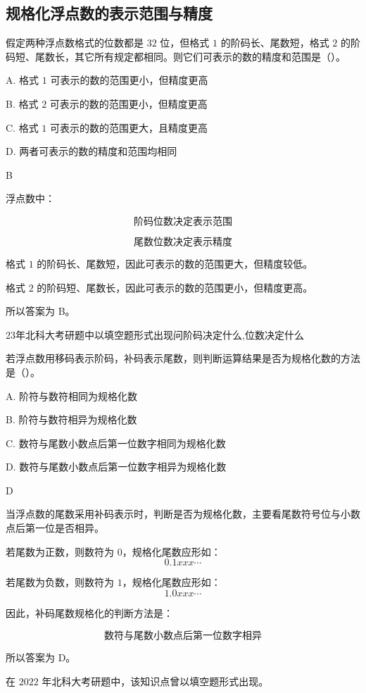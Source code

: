 \subsection{规格化浮点数的表示范围与精度}

\begin{question}
假定两种浮点数格式的位数都是 $32$ 位，但格式 $1$ 的阶码长、尾数短，格式 $2$ 的阶码短、尾数长，其它所有规定都相同。则它们可表示的数的精度和范围是（）。

A. 格式 $1$ 可表示的数的范围更小，但精度更高

B. 格式 $2$ 可表示的数的范围更小，但精度更高

C. 格式 $1$ 可表示的数的范围更大，且精度更高

D. 两者可表示的数的精度和范围均相同
\end{question}

\begin{answer}
B
\end{answer}

\begin{analysisenv}
浮点数中：

\[
\text{阶码位数决定表示范围}
\]

\[
\text{尾数位数决定表示精度}
\]

格式 $1$ 的阶码长、尾数短，因此可表示的数的范围更大，但精度较低。

格式 $2$ 的阶码短、尾数长，因此可表示的数的范围更小，但精度更高。

所以答案为 B。

23年北科大考研题中以填空题形式出现问阶码决定什么,位数决定什么
\end{analysisenv}




\begin{question}
若浮点数用移码表示阶码，补码表示尾数，则判断运算结果是否为规格化数的方法是（）。

A. 阶符与数符相同为规格化数

B. 阶符与数符相异为规格化数

C. 数符与尾数小数点后第一位数字相同为规格化数

D. 数符与尾数小数点后第一位数字相异为规格化数
\end{question}

\begin{answer}
D
\end{answer}

\begin{analysisenv}
当浮点数的尾数采用补码表示时，判断是否为规格化数，主要看尾数符号位与小数点后第一位是否相异。

若尾数为正数，则数符为 $0$，规格化尾数应形如：
\[
0.1xxx\cdots
\]

若尾数为负数，则数符为 $1$，规格化尾数应形如：
\[
1.0xxx\cdots
\]

因此，补码尾数规格化的判断方法是：

\[
\text{数符与尾数小数点后第一位数字相异}
\]

所以答案为 D。

在 $2022$ 年北科大考研题中，该知识点曾以填空题形式出现。
\end{analysisenv}




